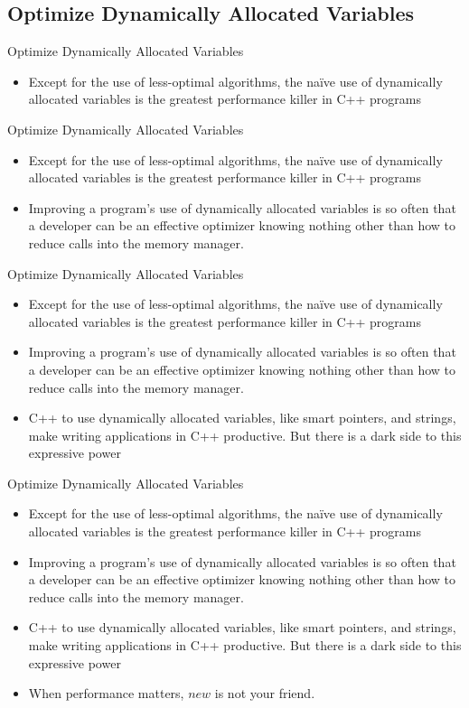 \documentclass[aspectratio=169,xcolor=dvipsnames]{beamer}
\begin{document}
\subsection{Optimize Dynamically Allocated Variables}
\begin{frame}{Optimize Dynamically Allocated Variables}
    \begin{itemize}
        \item Except for the use of less-optimal algorithms, the naïve use of dynamically allocated variables is the greatest performance killer in C++ programs
    \end{itemize}
\end{frame}
\begin{frame}{Optimize Dynamically Allocated Variables}
    \begin{itemize}
        \item Except for the use of less-optimal algorithms, the naïve use of dynamically allocated variables is the greatest performance killer in C++ programs
        \item Improving a program’s use of dynamically allocated variables is so often that a developer can be an effective optimizer knowing nothing other than how to reduce calls into the memory manager.
    \end{itemize}
\end{frame}
\begin{frame}{Optimize Dynamically Allocated Variables}
    \begin{itemize}
        \item Except for the use of less-optimal algorithms, the naïve use of dynamically allocated variables is the greatest performance killer in C++ programs
        \item Improving a program’s use of dynamically allocated variables is so often that a developer can be an effective optimizer knowing nothing other than how to reduce calls into the memory manager.
        \item C++ to use dynamically allocated variables, like smart pointers, and strings, make writing applications in C++ productive. But there is a dark side to this expressive power 
    \end{itemize}
\end{frame}
\begin{frame}{Optimize Dynamically Allocated Variables}
    \begin{itemize}
        \item Except for the use of less-optimal algorithms, the naïve use of dynamically allocated variables is the greatest performance killer in C++ programs
        \item Improving a program’s use of dynamically allocated variables is so often that a developer can be an effective optimizer knowing nothing other than how to reduce calls into the memory manager.
        \item C++ to use dynamically allocated variables, like smart pointers, and strings, make writing applications in C++ productive. But there is a dark side to this expressive power
        \item When performance matters, $new$ is not your friend.
    \end{itemize}
\end{frame}
\end{document}
